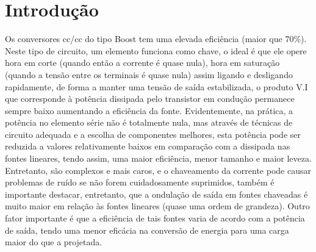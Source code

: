 \newpage
\section{Introdução}

Os conversores cc/cc do tipo Boost tem uma elevada eficiência (maior que 70\%). Neste tipo de circuito, um elemento funciona como chave, o ideal é que ele opere hora em corte (quando então a corrente é quase nula), hora em saturação (quando a tensão entre os terminais é quase nula) assim ligando e desligando rapidamente, de forma a manter uma tensão de saída estabilizada, o produto V.I que corresponde à potência dissipada pelo transistor em condução permanece sempre baixo aumentando a eficiência da fonte. Evidentemente, na prática, a potência no elemento série não é totalmente nula, mas através de técnicas de circuito adequada e a escolha de componentes melhores, esta potência pode ser reduzida a valores relativamente baixos em comparação com a dissipada nas fontes lineares, tendo assim, uma maior eficiência, menor tamanho e maior leveza. Entretanto, são complexos e mais caros, e o chaveamento da corrente pode causar problemas de ruído se não forem cuidadosamente suprimidos, também é importante destacar, entretanto, que a ondulação de saída em fontes chaveadas é muito maior em relação às fontes lineares (quase uma ordem de grandeza). Outro fator importante é que a eficiência de tais fontes varia de acordo com a potência de saída, tendo uma menor eficácia na conversão de energia para uma carga maior do que a projetada.